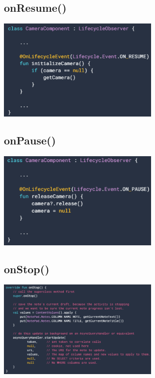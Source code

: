\documentclass{report}
\newenvironment{Figure}
	{\par\medskip\noindent\minipage{\linewidth}}
	{\endminipage\par\medskip}
\theoremstyle{definition}
\theoremstyle{example}
\begin{document}
\subsection{onResume()}
\begin{Figure}
   \centering
    \includegraphics[width=300px]{img/onResume.png}
        \label{fig:Code Snippet Create Activity Lifecycle onResume()}
\end{Figure}

\subsection{onPause()}
\begin{Figure}
   \centering
    \includegraphics[width=300px]{img/onPause.png}
        \label{fig:Code Snippet Create Activity Lifecycle onPause()}
\end{Figure}

\subsection{onStop()}
\begin{Figure}
   \centering
    \includegraphics[width=300px]{img/onStop.png}
        \label{fig:Code Snippet Create Activity Lifecycle onStop()}
\end{Figure}
\end{document}
